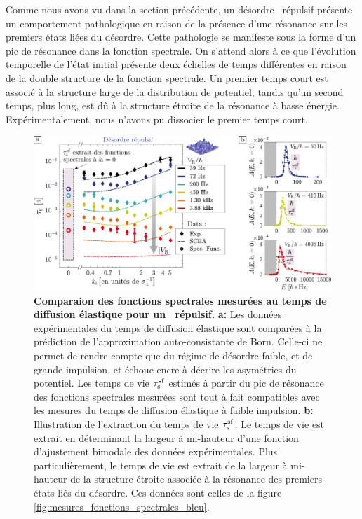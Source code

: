 Comme nous avons vu dans la section précédente, un désordre \speckle\ répulsif présente un comportement pathologique en raison de la présence d'une résonance sur les premiers états liées du désordre. Cette pathologie se manifeste sous la forme d'un pic de résonance dans la fonction spectrale. On s'attend alors à ce que l'évolution temporelle de l'état initial présente deux échelles de temps différentes en raison de la double structure de la fonction spectrale. Un premier temps court est associé à la structure large de la distribution de potentiel, tandis qu'un second temps, plus long, est dû à la structure étroite de la résonance à basse énergie. Expérimentalement, nous n'avons pu dissocier le premier temps court.

\begin{figure}
\centering
\includegraphics[width=\textwidth]{Fig/TauS_NJP/comparaison_specfunc_taus_bleu.pdf}
\caption{\textbf{Comparaion des fonctions spectrales mesurées au temps de diffusion élastique pour un \speckle\ répulsif.} \textbf{a:} Les données expérimentales du temps de diffusion élastique sont comparées à la prédiction de l'approximation auto-consistante de Born. Celle-ci ne permet de rendre compte que du régime de désordre faible, et de grande impulsion, et échoue encre à décrire les asymétries du potentiel. Les temps de vie $\tau_{\mathrm{s}}^{\mathrm{sf}}$ estimés à partir du pic de résonance des fonctions spectrales mesurées sont tout à fait compatibles avec les mesures du temps de diffusion élastique à faible impulsion. \textbf{b:} Illustration de l'extraction du temps de vie $\tau_{\mathrm{s}}^{\mathrm{sf}}$. Le temps de vie est extrait en déterminant la largeur à mi-hauteur d'une fonction d'ajustement bimodale des données expérimentales. Plus particulièrement, le temps de vie est extrait de la largeur à mi-hauteur de la structure étroite associée à la résonance des premiers états liés du désordre. Ces données sont celles de la figure \ref{fig:mesures_fonctions_spectrales_bleu}.}
\label{fig:comparaison_taus_specfunc_bleu}
\end{figure}

